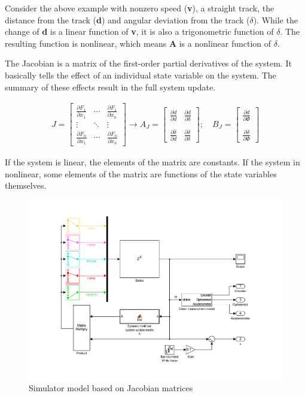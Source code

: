 Consider the above example with nonzero speed (\textbf{v}), a straight track, the distance from the track (\textbf{d}) and angular deviation from the track ($\delta$). While the change of \textbf{d} is a linear function of \textbf{v}, it is also a trigonometric function of $\delta$. The resulting function is nonlinear, which means \textbf{A} is a nonlinear function of $\delta$. 

The Jacobian is a matrix of the first-order partial derivatives of the system\cite[p. 294]{jacobian}. It basically tells the effect of an individual state variable on the system. The summary of these effects result in the full system update.

\begin{align}
J =
		 \begin{bmatrix}
		  \frac{\partial F_1}{\partial x_1} & \cdots & \frac{\partial F_1}{\partial x_n} \\
		  \vdots  & \ddots & \vdots  \\
		  \frac{\partial F_n}{\partial x_1} & \cdots & \frac{\partial F_n}{\partial x_n}
		 \end{bmatrix}
\longrightarrow
 A_J =
		 \begin{bmatrix}
           \frac{\partial \dot{d}}{\partial d} & \frac{\partial \dot{d}}{\partial \delta} \\
           & \\
           \frac{\partial \dot{\delta}}{\partial d} & \frac{\partial \dot{\delta}}{\partial \delta}
         \end{bmatrix}
; \quad
B_J =
         \begin{bmatrix}
               \frac{\partial \dot{d}}{\partial \Phi} \\
               \\
               \frac{\partial \dot{\delta}}{\partial \Phi}
         \end{bmatrix}
\end{align}

If the system is linear, the elements of the matrix are constants. If the system in nonlinear, some elements of the matrix are functions of the state variables themselves.

\begin{figure}[!ht]
    \centering
    \includegraphics[width=0.7\linewidth]{img/sys}
    \centering
    \vspace{-20pt}
    \caption{Simulator model based on Jacobian matrices}
    \label{fig:model}
\end{figure}

